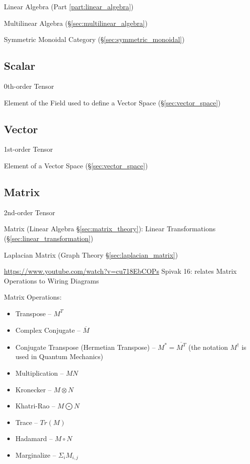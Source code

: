\begin{itemize}
Linear Algebra (Part \ref{part:linear_algebra})

Multilinear Algebra (\S\ref{sec:multilinear_algebra})

Symmetric Monoidal Category (\S\ref{sec:symmetric_monoidal})



\subsection{Scalar}\label{sec:scalar}

0th-order Tensor

Element of the Field used to define a Vector Space
(\S\ref{sec:vector_space})



\subsection{Vector}\label{sec:vector}

1st-order Tensor

Element of a Vector Space (\S\ref{sec:vector_space})



\subsection{Matrix}\label{sec:matrix}

2nd-order Tensor

Matrix (Linear Algebra \S\ref{sec:matrix_theory}):
Linear Transformations (\S\ref{sec:linear_transformation})

Laplacian Matrix (Graph Theory \S\ref{sec:laplacian_matrix})

\url{https://www.youtube.com/watch?v=cu718EbCOPs} Spivak 16: relates
Matrix Operations to Wiring Diagrams %

Matrix Operations:
\begin{itemize}
\item Transpose -- $M^T$
\item Complex Conjugate -- $\overline{M}$
\item Conjugate Transpose (Hermetian Transpose) -- $M^* = \overline{M^T}$
  (the notation $M^\dag$ is used in Quantum Mechanics)
\item Multiplication -- $MN$
\item Kronecker -- $M \otimes N$
\item Khatri-Rao -- $M \bigodot N$
\item Trace -- $Tr(M)$
\item Hadamard -- $M \circ N$
\item Marginalize -- $\Sigma_i M_{i,j}$
\end{itemize}




\end{itemize}

